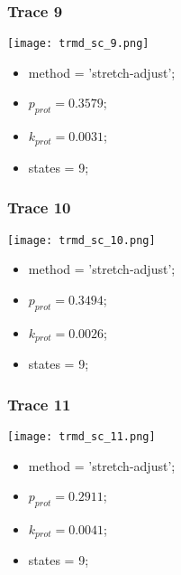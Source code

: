 \subsubsection{Trace 9}
\begin{minipage}[c]{0.7\textwidth}
    \texttt{[image: trmd\_sc\_9.png]}
\end{minipage}
\hfill
\begin{minipage}[c]{0.45\textwidth}
    \begin{itemize}
        \item method = 'stretch-adjust';
        \item $p_{prot}=0.3579$;
        \item $k_{prot}=0.0031$;
        \item states = 9;
    \end{itemize}
\end{minipage}

\subsubsection{Trace 10}
\begin{minipage}[c]{0.7\textwidth}
    \texttt{[image: trmd\_sc\_10.png]}
\end{minipage}
\hfill
\begin{minipage}[c]{0.45\textwidth}
    \begin{itemize}
        \item method = 'stretch-adjust';
        \item $p_{prot}=0.3494$;
        \item $k_{prot}=0.0026$;
        \item states = 9;
    \end{itemize}
\end{minipage}

\subsubsection{Trace 11}
\begin{minipage}[c]{0.7\textwidth}
    \texttt{[image: trmd\_sc\_11.png]}
\end{minipage}
\hfill
\begin{minipage}[c]{0.45\textwidth}
    \begin{itemize}
        \item method = 'stretch-adjust';
        \item $p_{prot}=0.2911$;
        \item $k_{prot}=0.0041$;
        \item states = 9;
    \end{itemize}
\end{minipage}

